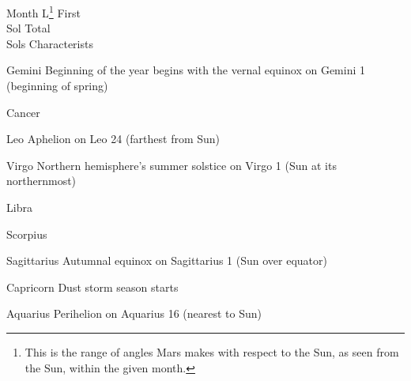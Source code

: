 {
    \bTABLE[split=repeat,option=stretch]
    \setupTABLE[column][5]
        [width=.52\textwidth,
        align=yes]
    \setupTABLE[row][each][align=center]
    \setupTABLE[5][1][align=center]

\bTABLEhead
    \bTR[bottomframe=on]
      \bTH  Month \eTH
      \bTH  L\footnote{This is the range of angles Mars makes with respect to the Sun, as seen from the Sun, within the given month.} \eTH
      \bTH  First\\Sol \eTH
      \bTH  Total\\Sols \eTH
      \bTH  Characterists \eTH
    \eTR
\eTABLEhead

\bTABLEbody
    \bTR
      \bTC Gemini \eTC
      \bTC \math{[0^{\circ}, 30^{\circ})}\eTC
       \eTC
       \eTC
      \bTC Beginning of the year begins with the vernal equinox on Gemini 1 (beginning of spring)\eTC
    \eTR
    
    \bTR
      \bTC Cancer \eTC
      \bTC \math{[30^{\circ}, 60^{\circ})} \eTC
       \eTC
       \eTC
      \bTC  \eTC
    \eTR
    
    \bTR
      \bTC Leo \eTC
      \bTC \math{[60^{\circ}, 90^{\circ})} \eTC
       \eTC
       \eTC
      \bTC Aphelion on Leo 24 (farthest from Sun)\eTC
    \eTR
    
    \bTR
      \bTC Virgo \eTC
      \bTC \math{[90^{\circ}, 120^{\circ})} \eTC
       \eTC
       \eTC
      \bTC Northern hemisphere's summer solstice on Virgo 1 (Sun at its northernmost)\eTC
    \eTR
    
    \bTR
      \bTC Libra \eTC
      \bTC \math{[120^{\circ}, 150^{\circ})} \eTC
       \eTC
       \eTC
      \bTC  \eTC
    \eTR
    
    \bTR
      \bTC Scorpius \eTC
      \bTC \math{[150^{\circ}, 180^{\circ})} \eTC
       \eTC
       \eTC
      \bTC  \eTC
    \eTR
    
    \bTR
      \bTC Sagittarius \eTC
      \bTC \math{[180^{\circ}, 210^{\circ})} \eTC
       \eTC
       \eTC
      \bTC Autumnal equinox on Sagittarius 1 (Sun over equator)\eTC
    \eTR
    
    \bTR
      \bTC Capricorn \eTC
      \bTC \math{[210^{\circ}, 240^{\circ})} \eTC
       \eTC
       \eTC
      \bTC Dust storm season starts \eTC
    \eTR
    
    \bTR
      \bTC Aquarius \eTC
      \bTC \math{[240^{\circ}, 270^{\circ})} \eTC
       \eTC
       \eTC
      \bTC Perihelion on Aquarius 16 (nearest to Sun)\eTC
    \eTR
    
}
